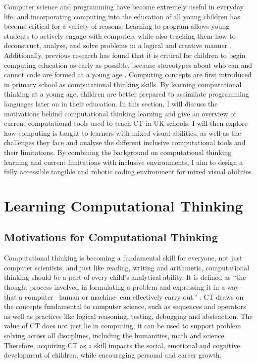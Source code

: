 \documentclass[oneside,%
                    author={Malak Hajji},
                    degree={BSc},
                    title={Designing An Accessible Ozobot Programming Platform for Students},
                  subtitle={With Mixed Visual Abilities}]{dissertation}
\begin{document}
Computer science and programming have become extremely useful in everyday life, and incorporating computing into the education of all young children has become critical for a variety of reasons. Learning to program allows young students to actively engage with computers while also teaching them how to deconstruct, analyse, and solve problems in a logical and creative manner \cite{CB-intro1}.
Additionally, previous research has found that it is critical for children to begin computing education as early as possible, because stereotypes about who can and cannot code are formed at a young age \cite{CB-intro2, CB-intro3}.
Computing concepts are first introduced in primary school as computational thinking skills. By learning computational thinking at a young age, children are better prepared to assimilate programming languages later on in their education. 
In this section, I will discuss the motivations behind computational thinking learning and give an overview of current computational tools used to teach CT in UK schools. I will then explore how computing is taught to learners with mixed visual abilities, as well as the challenges they face and analyse the different inclusive computational tools and their limitations. By combining the background on computational thinking learning and current limitations with  inclusive environments, I aim to design a fully accessible tangible  and robotic coding environment for mixed visual abilities.

\section{Learning Computational Thinking}  
\subsection{Motivations for Computational Thinking}
Computational thinking is becoming a fundamental skill for everyone, not just computer scientists, and just like reading, writing and arithmetic, computational thinking should be a part of every child’s analytical ability. It is defined as “the thought process involved in formulating a problem and expressing it in a way that a computer –human or machine- can effectively carry out.” \cite{CB-CT1}. CT draws on the concepts fundamental to computer science, such as sequences and operators as well as practices like logical reasoning, testing, debugging and abstraction. The value of CT does not just lie in computing, it can be used to support problem solving across all disciplines, including the humanities, math and science. Therefore, acquiring CT as a skill impacts the social, emotional and cognitive development of children, while encouraging personal and career growth.
\end{document}
